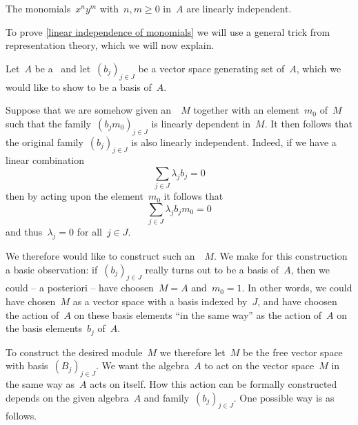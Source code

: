   
\begin{lemma}
  \label{linear independence of monomials}
  The monomials~$x^n y^m$ with~$n, m \geq 0$ in~$A$ are linearly independent.
\end{lemma}


\begin{fluff}
  To prove \cref{linear independence of monomials} we will use a general trick from representation theory, which we will now explain.
\end{fluff}


\begin{construction}
  \label{representation theory trick to construct a basis}
  Let~$A$ be a~\algebra{$\kf$} and let~$(b_j)_{j \in J}$ be a vector space generating set of~$A$, which we would like to show to be a basis of~$A$.

  Suppose that we are somehow given an~{}~$M$ together with an element~$m_0$ of~$M$ such that the family~$(b_j m_0)_{j \in J}$ is linearly dependent in~$M$.
  It then follows that the original family~$(b_j)_{j \in J}$ is also linearly independent.
  Indeed, if we have a linear combination
  \[
    \sum_{j \in J} \lambda_j b_j = 0
  \]
  then by acting upon the element~$m_0$ it follows that
  \[
    \sum_{j \in J} \lambda_j b_j m_0 = 0
  \]
  and thus~$\lambda_j = 0$ for all~$j \in J$.

  We therefore would like to construct such an~~$M$.
  We make for this construction a basic observation:
  if~$(b_j)_{j \in J}$ really turns out to be a basis of~$A$, then we could -- a posteriori -- have choosen~$M = A$ and~$m_0 = 1$.
  In other words, we could have chosen~$M$ as a vector space with a basis indexed by~$J$, and have choosen the action of~$A$ on these basis elements \enquote{in the same way} as the action of~$A$ on the basis elements~$b_j$ of~$A$.

  To construct the desired module~$M$ we therefore let~$M$ be the free vector space with basis~$(B_j)_{j \in J}$.
  We want the algebra~$A$ to act on the vector space~$M$ in the same way as~$A$ acts on itself.
  How this action can be formally constructed depends on the given algebra~$A$ and family~$(b_j)_{j \in J}$.
  One possible way is as follows.


\end{construction}
